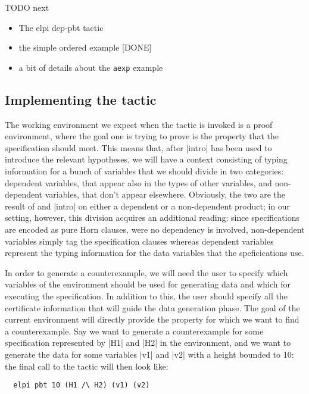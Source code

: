 \begin{metanote}
  TODO next
  \begin{itemize}
  \item The elpi dep-pbt tactic
  \item  the simple ordered example [DONE]
  \item a bit of details about the \texttt{aexp} example
  \end{itemize}
\end{metanote} 

\subsection{Implementing the tactic}
The working environment we expect when the tactic is invoked is a proof
environment, where the goal one is trying to prove is the property that the
specification should meet. This means that, after \lsti|intro| has been used to
introduce the relevant hypotheses, we will have a context consisting of
typing information for a bunch of variables that we should divide in two categories:
dependent variables, that appear also in the types of other variables, and non-dependent
variables, that don't appear elsewhere. Obviously, the two are the result of and \lsti|intro| on either
a dependent or a non-dependent product; in our setting, however, this division acquires an additional reading:
since specifications are encoded as pure Horn clauses, were no dependency is involved, non-dependent variables
simply tag the specification clauses whereas dependent variables represent the typing information for the data variables that 
the speficications use.

In order to generate a counterexample, we will need the user to specify which variables of the environment should
be used for generating data and which for executing the specification. In addition to this, the user should 
specify all the certificate information that will guide the data generation phase. The goal of the current environment will
directly provide the property for which we want to find a counterexample. Say we want to generate a counterexample for
some specification represented by \lsti|H1| and \lsti|H2| in the environment, and we want to generate the data for
some variables \lsti|v1| and \lsti|v2| with a height bounded to 10: the final call to the tactic will then 
look like:
\begin{lstlisting}
  elpi pbt 10 (H1 /\ H2) (v1) (v2)
\end{lstlisting}


